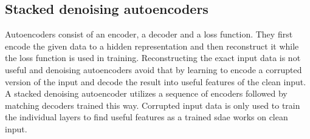 \subsection{Stacked denoising autoencoders}
Autoencoders consist of an encoder, a decoder and a loss function. They first encode the
given data to a hidden representation and then reconstruct it while the loss function is
used in training. Reconstructing the exact input data is not useful and denoising
autoencoders avoid that by learning to encode a corrupted version of the input and
decode the result into useful features of the clean input. A stacked denoising autoencoder
utilizes a sequence of encoders followed by matching decoders trained this way.
Corrupted input data is only used to train the individual layers to find useful features
as a trained \ac{sdae} works on clean input.~\cite{SDAE}
